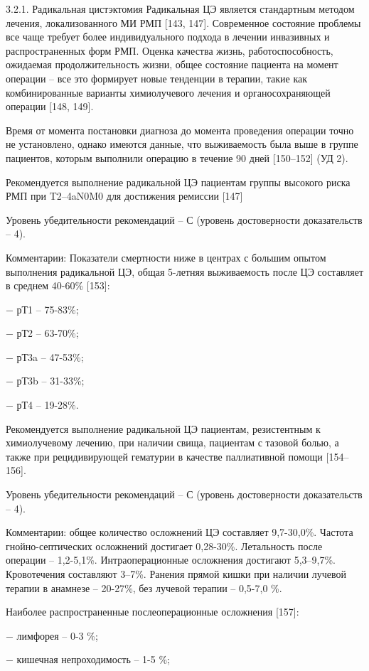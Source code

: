 3.2.1. Радикальная цистэктомия
Радикальная ЦЭ является стандартным методом лечения, локализованного МИ РМП [143, 147]. Современное состояние проблемы все чаще требует более индивидуального подхода в лечении инвазивных и распространенных форм РМП. Оценка качества жизнь, работоспособность, ожидаемая продолжительность жизни, общее состояние пациента на момент операции – все это формирует новые тенденции в терапии, такие как комбинированные варианты химиолучевого лечения и органосохраняющей операции [148, 149].

Время от момента постановки диагноза до момента проведения операции точно не установлено, однако имеются данные, что выживаемость была выше в группе пациентов, которым выполнили операцию в течение 90 дней [150–152] (УД 2).

Рекомендуется выполнение радикальной ЦЭ пациентам группы высокого риска РМП при T2–4aN0M0 для достижения ремиссии [147]

Уровень убедительности рекомендаций – С (уровень достоверности доказательств – 4).

Комментарии: Показатели смертности ниже в центрах с большим опытом выполнения радикальной ЦЭ, общая 5-летняя выживаемость после ЦЭ составляет в среднем 40-60\% [153]:

− рТ1 – 75-83\%;

− рТ2 – 63-70\%;

− рТ3a – 47-53\%;

− рТ3b – 31-33\%;

− рТ4 – 19-28\%.

Рекомендуется выполнение радикальной ЦЭ пациентам, резистентным к химиолучевому лечению, при наличии свища, пациентам с тазовой болью, а также при рецидивирующей гематурии в качестве паллиативной помощи [154–156].

Уровень убедительности рекомендаций – С (уровень достоверности доказательств – 4).

Комментарии: общее количество осложнений ЦЭ составляет 9,7-30,0\%. Частота гнойно-септических осложнений достигает 0,28-30\%. Летальность после операции – 1,2-5,1\%. Интраоперационные осложнения достигают 5,3–9,7\%. Кровотечения составляют 3–7\%. Ранения прямой кишки при наличии лучевой терапии в анамнезе – 20-27\%, без лучевой терапии – 0,5-7,0 \%.

Наиболее распространенные послеоперационные осложнения [157]:

− лимфорея – 0-3 \%;

− кишечная непроходимость – 1-5 \%;

